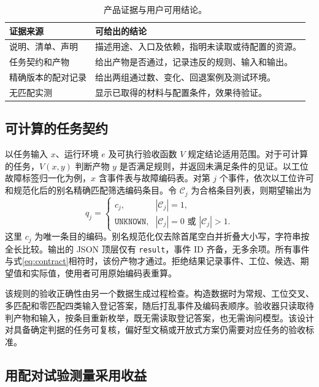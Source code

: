 \documentclass[final,5p,twocolumn,10pt]{elsarticle}
\newcommand{\code}[1]{\texttt{#1}}
\begin{document}
\begin{table}[!t]
\centering\small
\caption{产品证据与用户可用结论。}
\label{tab:evidence}
\begin{tabularx}{\columnwidth}{@{}p{}Y@{}}
\toprule
证据来源 & 可给出的结论 \\
\midrule
说明、清单、声明 & 描述用途、入口及依赖，指明未读取或待配置的资源。 \\
任务契约和产物 & 给出产物是否通过，记录违反的规则、输入和输出。 \\
精确版本的配对记录 & 给出两组通过数、变化、回退案例及测试环境。 \\
无匹配实测 & 显示已取得的材料与配置条件，效果待验证。 \\
\bottomrule
\end{tabularx}
\end{table}

\subsection{可计算的任务契约}

以任务输入 $x$、运行环境 $e$ 及可执行验收函数 $V$ 规定结论适用范围。对于可计算的任务，$V(x,y)$ 判断产物 $y$ 是否满足规则，并返回未满足条件的见证。以工位故障标签归一化为例，$x$ 含事件表与故障编码表。对第 $j$ 个事件，依次以工位许可和规范化后的别名精确匹配筛选编码条目。令 $\mathcal{C}_j$ 为合格条目列表，则期望输出为
\begin{equation}
 q_j=\begin{cases}
 c_j,& |\mathcal{C}_j|=1,\\
 \code{UNKNOWN},& |\mathcal{C}_j|=0\text{ 或 }|\mathcal{C}_j|>1.
 \end{cases}
 \label{eq:contract}
\end{equation}
这里 $c_j$ 为唯一条目的编码。别名规范化仅去除首尾空白并折叠大小写，字符串按全长比较。输出的 JSON 顶层仅有 \code{result}，事件 ID 齐备，无多余项。所有事件与式\eqref{eq:contract}相符时，该份产物才通过。拒绝结果记录事件、工位、候选、期望值和实际值，使用者可用原始编码表重算。

该规则的验收正确性由另一个数据生成过程检查。构造数据时为常规、工位交叉、多匹配和零匹配四类输入登记答案，随后打乱事件及编码表顺序。验收器只读取待判产物和输入，按条目重新枚举，既无需读取登记答案，也无需询问模型。该设计对具备确定判据的任务可复核，偏好型文稿或开放式方案仍需要对应任务的验收标准。

\subsection{用配对试验测量采用收益}
\end{document}
